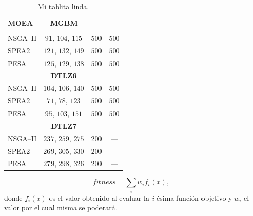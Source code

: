 \begin{table}[tb]
\caption{Mi tablita linda.}
\label{tab:comparison}
\centering
\begin{tabular}{lccc}
\toprule
\textbf{MOEA} & \textbf{MGBM} & \textbf{\citet{deb-thiele-laumanns-zitzler-04:scalable-test-problems}} & \textbf{\citet{Khare02}}\\
\otoprule
\multicolumn{4}{c}{\textbf{DTLZ3}}\\
\midrule
NSGA--II &  $91$, $104$, $115$ & $500$ & $500$ \\
SPEA2    & $121$, $132$, $149$ & $500$ & $500$ \\
PESA     & $125$, $129$, $138$ & $500$ & $500$ \\
\midrule
\multicolumn{4}{c}{\textbf{DTLZ6}}\\
\midrule
NSGA--II & $104$, $106$, $140$ & $500$ & $500$ \\
SPEA2    &  $71$,  $78$, $123$ & $500$ & $500$ \\
PESA     &  $95$, $103$, $151$ & $500$ & $500$ \\
\midrule
\multicolumn{4}{c}{\textbf{DTLZ7}}\\
\midrule
NSGA--II & $237$, $259$, $275$ & $200$ & --- \\
SPEA2    & $269$, $305$, $330$ & $200$ & --- \\
PESA     & $279$, $298$, $326$ & $200$ & --- \\
\bottomrule
\end{tabular}
\end{table}

\begin{equation}
   fitness = \sum_{i}w_if_i(x),
\end{equation}
donde $f_i(x)$ es el valor obtenido al evaluar la $i$-ésima función objetivo y  $w_i$ el valor por el cual
misma se poderará.